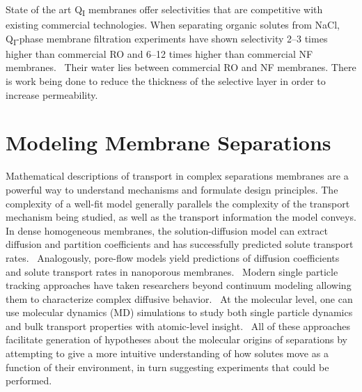   
  State of the art Q\textsubscript{I} membranes offer selectivities that
  are competitive with existing commercial technologies. When separating organic
  solutes from NaCl, Q\textsubscript{I}-phase membrane filtration experiments have
  shown selectivity 2--3 times higher than commercial RO and 6--12 times higher 
  than commercial NF membranes.~\cite{dischinger_application_2017} Their water 
  lies between commercial RO and NF membranes. There is work being done to reduce 
  the thickness of the selective layer in order to increase permeability. 

  \section{Modeling Membrane Separations}
  
  Mathematical descriptions of transport in complex separations membranes are a
  powerful way to understand mechanisms and formulate design principles.
  \cite{vinh-thang_predictive_2013,geens_transport_2006,darvishmanesh_mass_2016}
  The complexity of a well-fit model generally parallels the complexity of the
  transport mechanism being studied, as well as the transport information the
  model conveys. In dense homogeneous membranes, the solution-diffusion model
  can extract diffusion and partition coefficients and has successfully
  predicted solute transport rates.~\cite{wijmans_solution-diffusion_1995}
  Analogously, pore-flow models yield predictions of diffusion coefficients and
  solute transport rates in nanoporous membranes.~\cite{paul_diffusive_1974}
  Modern single particle tracking approaches have taken researchers beyond
  continuum modeling allowing them to characterize complex diffusive
  behavior.~\cite{manzo_review_2015} At the molecular level, one can use
  molecular dynamics (MD) simulations to study both single particle dynamics
  and bulk transport properties with atomic-level
  insight.~\cite{coscia_chemically_2019,maginn_best_2018} All of these
  approaches facilitate generation of hypotheses about the molecular origins of
  separations by attempting to give a more intuitive understanding of how
  solutes move as a function of their environment, in turn suggesting
  experiments that could be performed.
  
